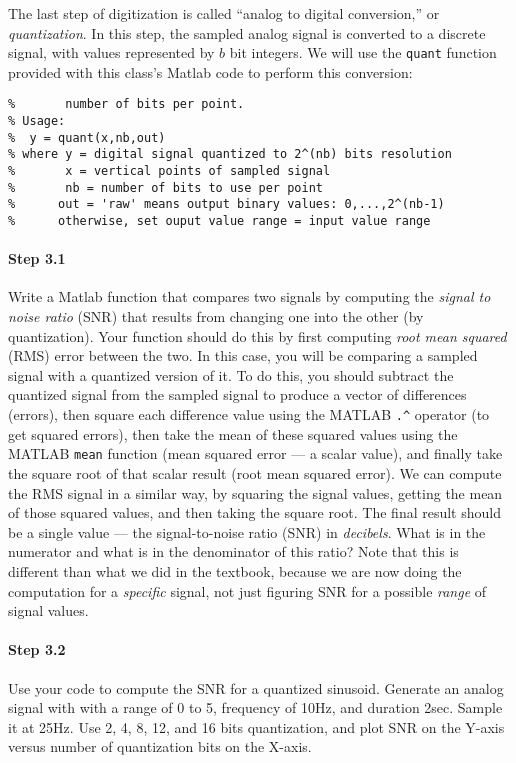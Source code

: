 The last step of digitization is called ``analog to digital
conversion,'' or \emph{quantization}. In this step, the sampled analog
signal is converted to a discrete signal, with values represented by
$b$ bit integers. We will use the \texttt{quant} function provided
with this class's Matlab code to perform this conversion:
\begin{lstlisting}[style=Matlab-editor,basicstyle=\mlttfamily\small]
% QUANT Quantize a sampled (discrete) signal using a prescribed
%       number of bits per point.
% Usage:
%  y = quant(x,nb,out)
% where y = digital signal quantized to 2^(nb) bits resolution
%       x = vertical points of sampled signal
%       nb = number of bits to use per point
%      out = 'raw' means output binary values: 0,...,2^(nb-1)
%      otherwise, set ouput value range = input value range
\end{lstlisting}

\paragraph{Step 3.1} Write a Matlab function that compares two signals
by computing the \emph{signal to noise ratio} (SNR) that results from
changing one into the other (by quantization). Your function should do
this by first computing \emph{root mean squared} (RMS) error between
the two. In this case, you will be comparing a sampled signal with a
quantized version of it.  To do this, you should subtract the
quantized signal from the sampled signal to produce a vector of
differences (errors), then square each difference value using the
MATLAB \verb|.^| operator (to get squared errors), then take the mean
of these squared values using the MATLAB \verb|mean| function (mean
squared error --- a scalar value), and finally take the square root of
that scalar result (root mean squared error). We can compute the RMS
signal in a similar way, by squaring the signal values, getting the
mean of those squared values, and then taking the square root. The
final result should be a single value --- the signal-to-noise ratio
(SNR) in \emph{decibels}. What is in the numerator and what is in the
denominator of this ratio? Note that this is different than what we
did in the textbook, because we are now doing the computation for a
\emph{specific} signal, not just figuring SNR for a possible
\emph{range} of signal values.



  \paragraph{Step 3.2} Use your code to compute the SNR for a
  quantized sinusoid. Generate an analog signal with with a range of 0
  to 5, frequency of 10Hz, and duration 2sec. Sample it at 25Hz. Use
  2, 4, 8, 12, and 16 bits quantization, and plot SNR on the Y-axis
  versus number of quantization bits on the X-axis.

